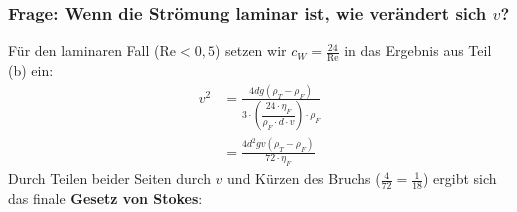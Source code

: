 \documentclass[a4paper,10pt,twoside]{article}
\begin{document}
\subsubsection*{Frage: Wenn die Strömung laminar ist, wie verändert sich $v$?}
Für den laminaren Fall ($\text{Re} < 0{,}5$) setzen wir $c_W = \frac{24}{\text{Re}}$ in das Ergebnis aus Teil (b) ein:
\begin{align*}
    v^2 &= \frac{4 d g (\rho_T - \rho_F)}{3 \cdot \left(\dfrac{24 \cdot \eta_F}{\rho_F \cdot d \cdot v}\right) \cdot \rho_F} \\
    &= \frac{4 d^2 g v (\rho_T - \rho_F)}{72 \cdot \eta_F}
\end{align*}
\ppbig
Durch Teilen beider Seiten durch $v$ und Kürzen des Bruchs ($\frac{4}{72} = \frac{1}{18}$) ergibt sich das finale \textbf{Gesetz von Stokes}:
\end{document}
